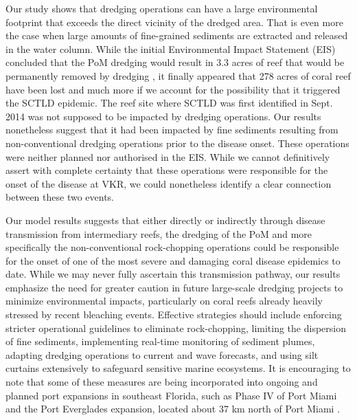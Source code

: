 \documentclass[preprint,12pt,authoryear]{elsarticle}
\begin{document}
Our study shows that dredging operations can have a large environmental footprint that exceeds the direct vicinity of the dredged area. That is even more the case when large amounts of fine-grained sediments are extracted and released in the water column. While the initial Environmental Impact Statement (EIS) concluded that the PoM dredging would result in 3.3 acres of reef that would be permanently removed by dredging \citep{USACE2004}, it finally appeared that 278 acres of coral reef have been lost \cite{noaa2023sedimentation} and much more if we account for the possibility that it triggered the SCTLD epidemic. The reef site where SCTLD was first identified in Sept. 2014 was not supposed to be impacted by dredging operations. Our results nonetheless suggest that it had been impacted by fine sediments resulting from non-conventional dredging operations prior to the disease onset. These operations were neither planned nor authorised in the EIS. While we cannot definitively assert with complete certainty that these operations were responsible for the onset of the disease at VKR, we could nonetheless identify a clear connection between these two events.

Our model results suggests that either directly or indirectly through disease transmission from intermediary reefs, the dredging of the PoM and more specifically the non-conventional rock-chopping operations could be responsible for the onset of one of the most severe and damaging coral disease epidemics to date. While we may never fully ascertain this transmission pathway, our results emphasize the need for greater caution in future large-scale dredging projects to minimize environmental impacts, particularly on coral reefs already heavily stressed by recent bleaching events. Effective strategies should include enforcing stricter operational guidelines to eliminate rock-chopping, limiting the dispersion of fine sediments, implementing real-time monitoring of sediment plumes, adapting dredging operations to current and wave forecasts, and using silt curtains extensively to safeguard sensitive marine ecosystems. It is encouraging to note that some of these measures are being incorporated into ongoing and planned port expansions in southeast Florida, such as Phase IV of Port Miami and the Port Everglades expansion, located about 37 km north of Port Miami \cite{noaa2023sedimentation}.
\end{document}
